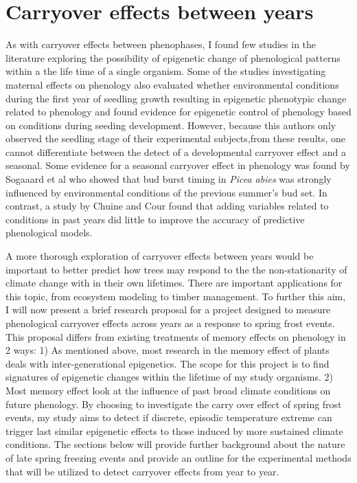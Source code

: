 \documentclass{article}\usepackage[]{graphicx}\usepackage[]{color}
\begin{document}
\section{Carryover effects between years}
\par As with carryover effects between phenophases, I found few studies in the literature exploring the possibility of epigenetic change of phenological patterns within a the life time of a single organism.
Some of the studies investigating maternal effects on phenology also evaluated whether environmental conditions during the first year of seedling growth resulting in epigenetic phenotypic change related to phenology \citep{Gomery2015} and found evidence for epigenetic control of phenology based on conditions during seeding development. However, because this authors only observed the seedling stage of their experimental subjects,from these results, one cannot differentiate between the detect of a developmental carryover effect and a seasonal. Some evidence for a seasonal carryover effect in phenology was found by Sogaaard et al \citeyear{Sogaard2008} who showed that  bud burst timing in \textit{Picea abies} was strongly influenced by environmental conditions of the previous summer's bud set. In contrast, a study by Chuine and Cour \citeyear{Chuine1999} found that adding variables related to conditions in past years did little to improve the accuracy of predictive phenological models.
\par A more thorough exploration of carryover effects between years would be important to better predict how trees may respond to the the non-stationarity of climate change with in their own lifetimes. There are important applications for this topic, from ecosystem modeling to timber management. To further this aim, I will now present a brief research proposal for a project designed to measure phenological carryover effects across years as a response to spring frost events.  
This proposal differs from existing treatments of memory effects on phenology in 2 ways:
1) As mentioned above, most research in the memory effect of plants deals with inter-generational epigenetics. The scope for this project is to find signatures of epigenetic changes within the lifetime of my study organisms.
2) Most memory effect look at the influence of past broad climate conditions on future phenology. By choosing to investigate the carry over effect of spring frost events, my study aims to detect if discrete, episodic temperature extreme can trigger last similar epigenetic effects to those induced by more sustained climate conditions. The sections below will provide further background about the nature of late spring freezing events and provide an outline for the experimental methods that will be utilized to detect carryover effects from year to year.
\end{document}

